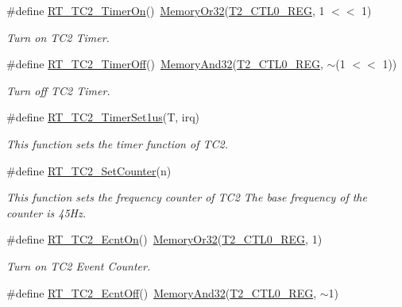 \begin{DoxyCompactItemize}
\#define \mbox{\hyperlink{a00047_ab274ee44af2080d68745b2ec3af06648}{R\+T\+\_\+\+T\+C2\+\_\+\+Timer\+On}}()~\mbox{\hyperlink{a00020_a27874a97deab7cecdde5ddecf466e31e}{Memory\+Or32}}(\mbox{\hyperlink{a00020_a5853553391e986211306d4f29ab31e47}{T2\+\_\+\+C\+T\+L0\+\_\+\+R\+EG}}, 1 $<$$<$ 1)
\begin{DoxyCompactList}\small\item\em Turn on T\+C2 Timer. \end{DoxyCompactList}\item 
\#define \mbox{\hyperlink{a00047_a4328299fe0323ef75508eadf9b937ba1}{R\+T\+\_\+\+T\+C2\+\_\+\+Timer\+Off}}()~\mbox{\hyperlink{a00020_ad87cedffcaadc51db22594fce55173d4}{Memory\+And32}}(\mbox{\hyperlink{a00020_a5853553391e986211306d4f29ab31e47}{T2\+\_\+\+C\+T\+L0\+\_\+\+R\+EG}}, $\sim$(1 $<$$<$ 1))
\begin{DoxyCompactList}\small\item\em Turn off T\+C2 Timer. \end{DoxyCompactList}\item 
\#define \mbox{\hyperlink{a00047_a005265e28d070ee73720939fca9a815a}{R\+T\+\_\+\+T\+C2\+\_\+\+Timer\+Set1us}}(T,  irq)
\begin{DoxyCompactList}\small\item\em This function sets the timer function of T\+C2. \end{DoxyCompactList}\item 
\#define \mbox{\hyperlink{a00047_a28ff54e7b5cd20e082ea21b6731d5b51}{R\+T\+\_\+\+T\+C2\+\_\+\+Set\+Counter}}(n)
\begin{DoxyCompactList}\small\item\em This function sets the frequency counter of T\+C2 The base frequency of the counter is 45\+Hz. \end{DoxyCompactList}\item 
\#define \mbox{\hyperlink{a00047_a261544e2cbdbdeee0d22734b29827cd2}{R\+T\+\_\+\+T\+C2\+\_\+\+Ecnt\+On}}()~\mbox{\hyperlink{a00020_a27874a97deab7cecdde5ddecf466e31e}{Memory\+Or32}}(\mbox{\hyperlink{a00020_a5853553391e986211306d4f29ab31e47}{T2\+\_\+\+C\+T\+L0\+\_\+\+R\+EG}}, 1)
\begin{DoxyCompactList}\small\item\em Turn on T\+C2 Event Counter. \end{DoxyCompactList}\item 
\#define \mbox{\hyperlink{a00047_af77e205baae8e267fda5374c167ab76c}{R\+T\+\_\+\+T\+C2\+\_\+\+Ecnt\+Off}}()~\mbox{\hyperlink{a00020_ad87cedffcaadc51db22594fce55173d4}{Memory\+And32}}(\mbox{\hyperlink{a00020_a5853553391e986211306d4f29ab31e47}{T2\+\_\+\+C\+T\+L0\+\_\+\+R\+EG}}, $\sim$1)

\end{DoxyCompactItemize}
